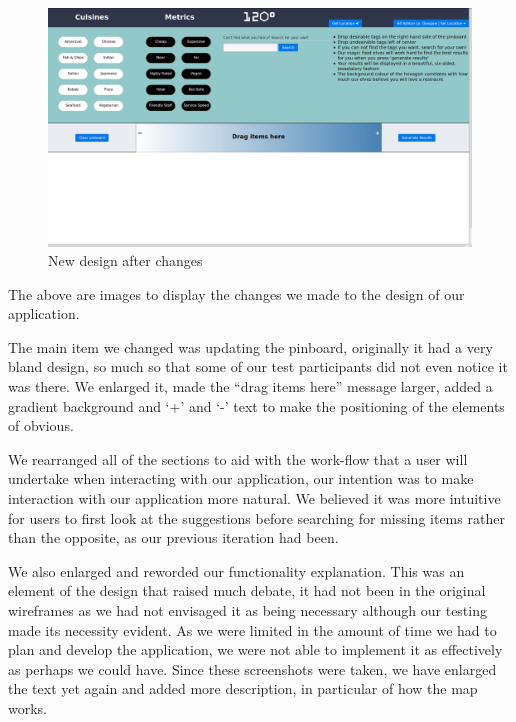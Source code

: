 \documentclass[10pt,a4paper]{article}
\begin{document}
\begin{figure}[H]
	\begin{center}
		\includegraphics[scale=0.2]{superNewScreenshot.png}
		\caption{New design after changes}
		\label{figure:new-design}
	\end{center}
\end{figure}

The above are images to display the changes we made to the design of our application. 

The main item we changed was updating the pinboard, originally it had a very bland design, so much so that some of our test participants did not even notice it was there. We enlarged it, made the “drag items here” message larger, added a gradient background and ‘+’ and ‘-’ text to make the positioning of the elements of obvious. 

We rearranged all of the sections to aid with the work-flow that a user will undertake when interacting with our application, our intention was to make interaction with our application more natural. We believed it was more intuitive for users to first look at the suggestions before searching for missing items rather than the opposite, as our previous iteration had been.

We also enlarged and reworded our functionality explanation. This was an element of the design that raised much debate, it had not been in the original wireframes as we had not envisaged it as being necessary although our testing made its necessity evident. As we were limited in the amount of time we had to plan and develop the application, we were not able to implement it as effectively as perhaps we could have. Since these screenshots were taken, we have enlarged the text yet again and added more description, in particular of how the map works.
\end{document}

